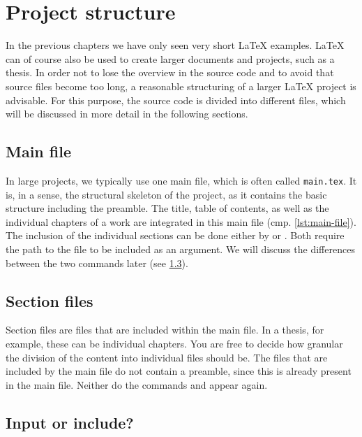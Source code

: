 \chapter{Project structure}
\label{sec:project-structure}

In the previous chapters we have only seen very short \LaTeX{} examples. \LaTeX{} can of course also be used to create larger documents and projects, such as a thesis. 
In order not to lose the overview in the source code and to avoid that source files become too long, a reasonable structuring of a larger \LaTeX{} project is advisable. For this purpose, the source code is divided into different files, which will be discussed in more detail in the following sections.

\section{Main file}

In large projects, we typically use one main file, which is often called \texttt{main.tex}. It is, in a sense, the structural skeleton of the project, as it contains the basic structure including the preamble. The title, table of contents, as well as the individual chapters of a work are integrated in this main file (cmp. \cref{lst:main-file}). The inclusion of the individual sections can be done either by \texttt{} or \texttt{}. Both require the path to the file to be included as an argument. We will discuss the differences between the two commands later (see \cref{sec:input-vs-include}).


\section{Section files}
Section files are files that are included within the main file. In a thesis, for example, these can be individual chapters. You are free to decide how granular the division of the content into individual files should be.
The files that are included by the main file do not contain a preamble, since this is already present in the main file. Neither do the commands \texttt{} and \texttt{} appear again.

\section{Input or include?}
\label{sec:input-vs-include}

